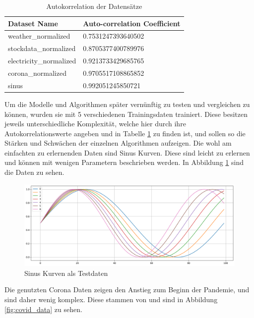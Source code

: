 \begin{table}[ht]
    \centering
    \caption{Autokorrelation der Datensätze}
    \begin{tabular}{ll}
        \toprule
        \textbf{Dataset Name}   & \textbf{Auto-correlation Coefficient} \\
        \midrule
        weather\_normalized     & 0.7531247393640502                    \\
        stockdata\_normalized   & 0.8705377400789976                    \\
        electricity\_normalized & 0.9213733429685765                    \\
        corona\_normalized      & 0.9705517108865852                    \\
        sinus                   & 0.992051245850721                     \\
        \bottomrule
    \end{tabular}
    \label{tab:autocorrelation_coefficients}
\end{table}


Um die Modelle und Algorithmen später vernünftig zu testen und vergleichen zu können, wurden sie mit 5 verschiedenen Trainingsdaten trainiert.
Diese besitzen jeweils unterschiedliche Komplexität, welche hier durch ihre Autokorrelationswerte angeben und in Tabelle \ref{tab:autocorrelation_coefficients} zu finden ist, und sollen so die Stärken und Schwächen der einzelnen Algorithmen aufzeigen.
Die wohl am einfachten zu erlernenden Daten sind Sinus Kurven. Diese sind leicht zu erlernen und können mit wenigen Parametern beschrieben werden.
In Abbildung \ref{fig:sinus_data} sind die Daten zu sehen.

\begin{figure}[ht]
    \centering
    \includegraphics[width=1\textwidth]{includes/figures/graphs/sinus.png}
    \caption{Sinus Kurven als Testdaten}
    \label{fig:sinus_data}
\end{figure}

Die genutzten Corona Daten zeigen den Anstieg zum Beginn der Pandemie, und sind daher wenig komplex. Diese stammen von \cite{covid19g12:online} und sind in Abbildung \ref{fig:covid_data} zu sehen.

